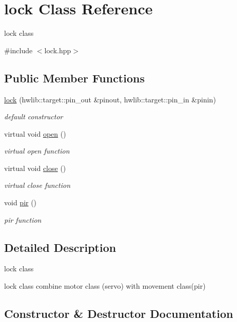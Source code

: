 \hypertarget{classlock}{}\section{lock Class Reference}
\label{classlock}


lock class  




{\ttfamily \#include $<$lock.\+hpp$>$}

\subsection*{Public Member Functions}
\begin{DoxyCompactItemize}
\item 
\hyperlink{classlock_a70661afaf29f414bf0b838dfbc9c10a6}{lock} (hwlib\+::target\+::pin\+\_\+out \&pinout, hwlib\+::target\+::pin\+\_\+in \&pinin)
\begin{DoxyCompactList}\small\item\em default constructor \end{DoxyCompactList}\item 
virtual void \hyperlink{classlock_a773859340b99fff94e8a21206d5906bd}{open} ()
\begin{DoxyCompactList}\small\item\em virtual open function \end{DoxyCompactList}\item 
virtual void \hyperlink{classlock_a7e4aac202a1b73f57338ea7f935cf9ce}{close} ()
\begin{DoxyCompactList}\small\item\em virtual close function \end{DoxyCompactList}\item 
void \hyperlink{classlock_a1e203e71ff7300d4202516c1b08c3ad2}{pir} ()
\begin{DoxyCompactList}\small\item\em pir function \end{DoxyCompactList}\end{DoxyCompactItemize}


\subsection{Detailed Description}
lock class 

lock class combine motor class (servo) with movement class(pir) 

\subsection{Constructor \& Destructor Documentation}
